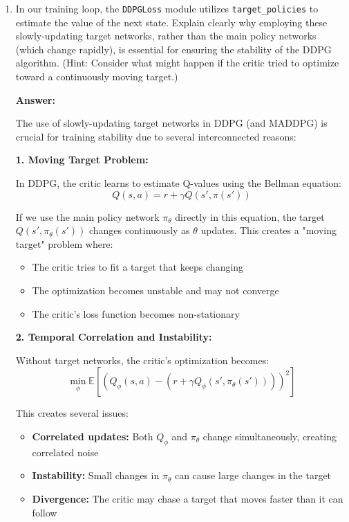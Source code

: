 \documentclass[12pt]{article}
\begin{document}
{{{{{{\begin{enumerate}
    \item In our training loop, the \texttt{DDPGLoss} module utilizes \texttt{target\_policies} to estimate the value of the next state. Explain clearly why employing these slowly-updating target networks, rather than the main policy networks (which change rapidly), is essential for ensuring the stability of the DDPG algorithm. (Hint: Consider what might happen if the critic tried to optimize toward a continuously moving target.)
    
    \textbf{Answer:}
    
    The use of slowly-updating target networks in DDPG (and MADDPG) is crucial for training stability due to several interconnected reasons:
    
    \textbf{1. Moving Target Problem:}
    
    In DDPG, the critic learns to estimate Q-values using the Bellman equation:
    $$Q(s,a) = r + \gamma Q(s', \pi(s'))$$
    
    If we use the main policy network $\pi_\theta$ directly in this equation, the target $Q(s', \pi_\theta(s'))$ changes continuously as $\theta$ updates. This creates a "moving target" problem where:
    
    \begin{itemize}
        \item The critic tries to fit a target that keeps changing
        \item The optimization becomes unstable and may not converge
        \item The critic's loss function becomes non-stationary
    \end{itemize}
    
    \textbf{2. Temporal Correlation and Instability:}
    
    Without target networks, the critic's optimization becomes:
    $$\min_\phi \mathbb{E}[(Q_\phi(s,a) - (r + \gamma Q_\phi(s', \pi_\theta(s'))))^2]$$
    
    This creates several issues:
    \begin{itemize}
        \item \textbf{Correlated updates:} Both $Q_\phi$ and $\pi_\theta$ change simultaneously, creating correlated noise
        \item \textbf{Instability:} Small changes in $\pi_\theta$ can cause large changes in the target
        \item \textbf{Divergence:} The critic may chase a target that moves faster than it can follow
    \end{itemize}
    

\end{enumerate}}}}}}}
\end{document}
